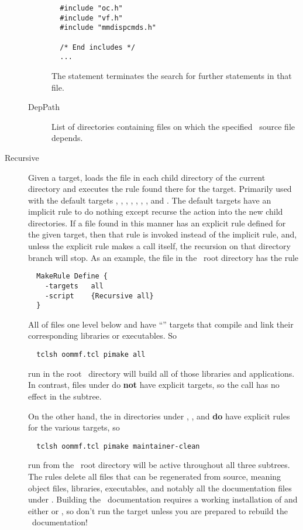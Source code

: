 \begin{description}
\begin{description}
\begin{verbatim}
  #include "oc.h"
  #include "vf.h"
  #include "mmdispcmds.h"

  /* End includes */
  ...
\end{verbatim}
   The  statement terminates the search for
   further  statements in that file.
  \item[DepPath] List of directories containing files on which
    the specified \Cplusplus\ source file depends.
  \end{description}
\item[Recursive] Given a target, loads the  file in
  each child directory of the current directory and executes the rule
  found there for the target. Primarily used with the default targets
  , , , , ,
  , , and . The default
  targets have an implicit rule to do nothing except recurse the action
  into the new child directories. If a  file found in
  this manner has an explicit rule defined for the given target, then
  that rule is invoked instead of the implicit rule, and, unless the
  explicit rule makes a  call itself, the recursion on
  that directory branch will stop. As an example, the 
  file in the \OOMMF\ root directory has the rule
\begin{verbatim}
  MakeRule Define {
    -targets   all
    -script    {Recursive all}
  }
\end{verbatim}
  All of  files one level below  and
   have ``'' targets that compile and link their
  corresponding libraries or executables. So
\begin{verbatim}
  tclsh oommf.tcl pimake all
\end{verbatim}
  run in the root \OOMMF\ directory will build all of those libraries
  and applications. In contrast,  files under
   do \textbf{not} have explicit  targets, so the
   call has no effect in the 
  subtree.

  On the other hand, the  in directories under
  , , and  \textbf{do} have
  explicit rules for the various  targets, so
\begin{verbatim}
  tclsh oommf.tcl pimake maintainer-clean
\end{verbatim}
  run from the \OOMMF\ root directory will be active throughout all
  three subtrees. The  rules delete all files that
  can be regenerated from source, meaning object files, libraries,
  executables, and notably all the documentation files under
  . Building the \OOMMF\ documentation requires a working
  installation of
   and
  either 
  or , so
  don't run the  target unless you are prepared to
  rebuild the \OOMMF\ documentation!
\end{description}
